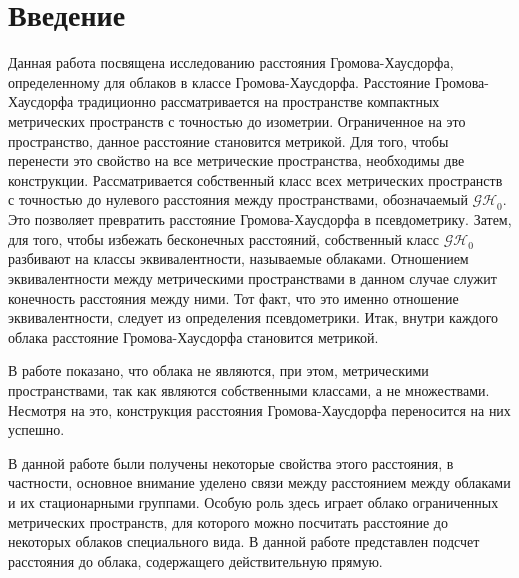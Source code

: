 \section*{Введение}  
 	Данная работа посвящена исследованию расстояния Громова-Хаусдорфа,
определенному для облаков в классе Громова-Хаусдорфа. Расстояние
Громова-Хаусдорфа традиционно рассматривается на пространстве компактных
метрических пространств с точностью до изометрии. Ограниченное на это
пространство, данное расстояние становится метрикой. Для того, чтобы перенести
это свойство на все метрические пространства, необходимы две конструкции.
Рассматривается собственный класс всех метрических пространств с точностью до
нулевого расстояния между пространствами, обозначаемый $\mathcal{GH}_0$. Это
позволяет превратить расстояние Громова-Хаусдорфа в псевдометрику. Затем, для
того, чтобы избежать бесконечных расстояний, собственный класс $\mathcal{GH}_0$
разбивают на классы эквивалентности, называемые облаками. Отношением
эквивалентности между метрическими пространствами в данном случае служит
конечность расстояния между ними. Тот факт, что это именно отношение
эквивалентности, следует из определения псевдометрики.  Итак, внутри каждого
облака расстояние Громова-Хаусдорфа становится метрикой.

	В работе показано, что облака не являются, при этом, метрическими
пространствами, так как являются собственными классами, а не множествами.
Несмотря на это, конструкция расстояния  Громова-Хаусдорфа переносится на них
успешно.
 	
	В данной работе были получены некоторые свойства этого расстояния,  в
частности, основное внимание уделено связи между расстоянием между  облаками и
их стационарными группами. Особую роль здесь играет облако ограниченных
метрических пространств, для которого можно посчитать расстояние до некоторых
облаков специального вида. В данной работе представлен  подсчет расстояния до
облака, содержащего действительную прямую.
